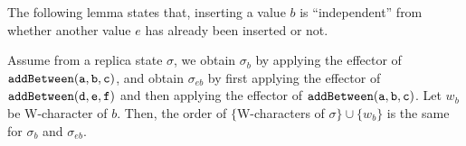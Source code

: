 The following lemma states that, inserting a value $b$ is ``independent'' from whether another value $e$ has already been inserted or not.

\begin{lemma}
\label{lemma:in Wooki algorithm,the order of sigma and b is the same, between insert b and first insert e and then insert b}
Assume from a replica state $\sigma$, we obtain $\sigma_b$ by applying the effector of $\alabelshort[{\tt addBetween}]{a,b,c}$, and obtain $\sigma_{eb}$ by first applying the effector of $\alabelshort[{\tt addBetween}]{d,e,f}$ and then applying the effector of $\alabelshort[{\tt addBetween}]{a,b,c}$. Let $w_b$ be W-character of $b$. Then, the order of $\{$W-characters of $\sigma \} \cup \{ w_b \}$ is the same for $\sigma_b$ and $\sigma_{eb}$.
\end{lemma}

